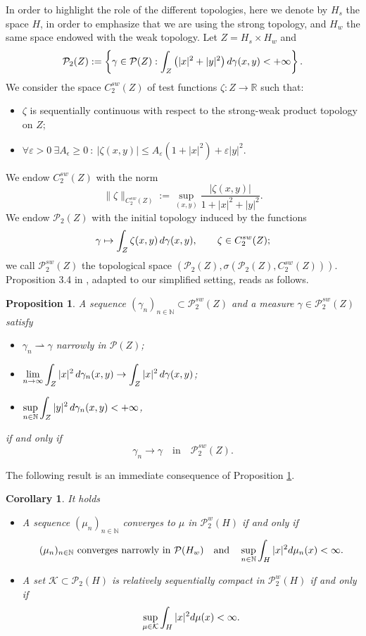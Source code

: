 \documentclass[12pt,a4paper]{article}
\newcommand{\e}{\varepsilon}
\newcommand{\N}{\mathbb{N}}
\newcommand{\R}{\mathbb{R}}
\renewcommand{\P}{\mathcal{P}}
\renewcommand{\d}{{\rm d}}
\newcommand{\weakto}{\rightharpoonup}
\newcommand{\X}{\mathcal{P}_2(H)}
\theoremstyle{plain}
\newtheorem{corollary}[theorem]{Corollary}
\newtheorem{proposition}[theorem]{Proposition}
\theoremstyle{definition}
\begin{document}
In order to highlight the role of the different topologies, here we denote by $H_s$ the space $H$, in order to emphasize that we are using the strong topology, and $H_w$ the same space endowed with the weak topology. Let $Z= H_s \times H_w$ and 
\[
	\P_2(Z) := \left\{ \gamma \in \P(Z): \int_Z \left( |x|^2+|y|^2\right)\d \gamma(x,y)<+\infty \right\}.
\]
We consider the space $C^{sw}_2(Z)$ of test functions $\zeta :Z \to \R$ such that:
 \begin{itemize}
    \item $\zeta$ is sequentially continuous with respect to the strong-weak product topology on $Z$;
	\item $\forall \e >0\ \exists A_\epsilon \geq 0\ :\ |\zeta(x,y)| \leq A_\e \left( 1+|x|^2\right) +\e|y|^2.$
 \end{itemize}
We endow $C^{sw}_2(Z)$ with the norm
\[
	\|\zeta\|_{C^{sw}_2(Z)} := \sup_{(x,y)} \frac{|\zeta(x,y)|}{1+|x|^2 +|y|^2}.
\]
We endow $\P_2(Z)$ with the initial topology induced by the functions
\[
	\gamma \mapsto \int_Z \zeta(x,y)\, \d\gamma(x,y),\qquad \zeta \in C_2^{sw}(Z);
\]	
we call $\P_2^{sw}(Z)$ the topological space $(\P_2(Z),\sigma(\P_2(Z),C_2^{sw}(Z)))$. Proposition 3.4 in \cite{naldi-savare}, adapted to our simplified setting, reads as follows.
\begin{proposition}
\label{prop:NS}
A sequence $(\gamma_n)_{n\in \N} \subset \P_2^{sw}(Z)$ and a measure $\gamma \in \P_2^{sw}(Z)$ satisfy
\begin{itemize}
	\item[\rm{(i)}] $\gamma_n \weakto \gamma$ narrowly in $\P(Z)$;
	\item[\rm{(ii)}] $\displaystyle \lim_{n\to \infty} \int_Z |x|^2\, \d\gamma_n(x,y) \to \int_Z |x|^2\, \d \gamma(x,y)$;
	\item[\rm{(iii)}] $\displaystyle \sup_{n \in \N} \int_Z |y|^2\, \d\gamma_n(x,y) < +\infty$, 
\end{itemize}	
if and only if
\[
	\gamma_n \to \gamma\quad  \text{in}\quad \P_2^{sw}(Z).
\]
\end{proposition}
The following result \cite[Corollary 3.6]{naldi-savare} is an immediate consequence of Proposition \ref{prop:NS}.
\begin{corollary}
\label{cor:NS}
It holds
\begin{itemize}
	\item[\rm{(i)}] A sequence $(\mu_n)_{n\in \N}$ converges to $\mu$ in $\P_2^w(H)$ if and only if
	\[
		(\mu_n)_{n\in \N} \text{ converges narrowly in }\P(H_w)\quad \text{and}\quad \sup_{n \in \N}\int_H |x|^2\d\mu_n(x) < \infty.
	\]	
	\item[\rm{(ii)}] A set $\mathcal K \subset \X$ is relatively sequentially compact in $\P_2^w(H)$ if and only if
	\[
		\sup_{\mu \in \mathcal K}\int_H |x|^2\d\mu(x) < \infty.
	\]
\end{itemize}	
\end{corollary}
\end{document}
